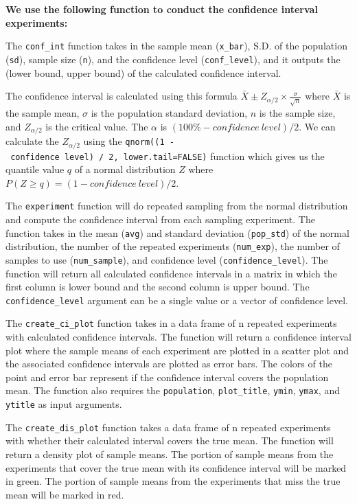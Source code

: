 \documentclass[
]{article}
\begin{document}
\textbf{We use the following function to conduct the confidence interval
experiments:}

The \texttt{conf\_int} function takes in the sample mean
(\texttt{x\_bar}), S.D. of the population (\texttt{sd}), sample size
(\texttt{n}), and the confidence level (\texttt{conf\_level}), and it
outputs the (lower bound, upper bound) of the calculated confidence
interval.

The confidence interval is calculated using this formula
\(\bar{X} \pm Z_{\alpha/2} \times \frac{\sigma}{\sqrt{n}}\) where
\(\bar{X}\) is the sample mean, \(\sigma\) is the population standard
deviation, \(n\) is the sample size, and \(Z_{\alpha/2}\) is the
critical value. The \(\alpha\) is \((100\% - confidence~level) / 2\). We
can calculate the \(Z_{\alpha/2}\) using the
\texttt{qnorm((1\ -\ confidence\ level)\ /\ 2,\ lower.tail=FALSE)}
function which gives us the quantile value \(q\) of a normal
distribution \(Z\) where \(P(Z \geq q) = (1 - confidence\ level) / 2\).

The \texttt{experiment} function will do repeated sampling from the
normal distribution and compute the confidence interval from each
sampling experiment. The function takes in the mean (\texttt{avg}) and
standard deviation (\texttt{pop\_std}) of the normal distribution, the
number of the repeated experiments (\texttt{num\_exp}), the number of
samples to use (\texttt{num\_sample}), and confidence level
(\texttt{confidence\_level}). The function will return all calculated
confidence intervals in a matrix in which the first column is lower
bound and the second column is upper bound. The
\texttt{confidence\_level} argument can be a single value or a vector of
confidence level.

The \texttt{create\_ci\_plot} function takes in a data frame of n
repeated experiments with calculated confidence intervals. The function
will return a confidence interval plot where the sample means of each
experiment are plotted in a scatter plot and the associated confidence
intervals are plotted as error bars. The colors of the point and error
bar represent if the confidence interval covers the population mean. The
function also requires the \texttt{population}, \texttt{plot\_title},
\texttt{ymin}, \texttt{ymax}, and \texttt{ytitle} as input arguments.

The \texttt{create\_dis\_plot} function takes a data frame of n repeated
experiments with whether their calculated interval covers the true mean.
The function will return a density plot of sample means. The portion of
sample means from the experiments that cover the true mean with its
confidence interval will be marked in green. The portion of sample means
from the experiments that miss the true mean will be marked in red.
\end{document}
